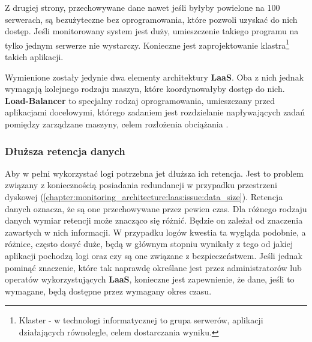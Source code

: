     Z drugiej strony, przechowywane dane nawet jeśli byłyby powielone na 100 serwerach, są bezużyteczne bez oprogramowania, które
    pozwoli uzyskać do nich dostęp. Jeśli monitorowany system jest duży, umieszczenie takiego programu na tylko jednym serwerze nie wystarczy.
    Konieczne jest zaprojektowanie klastra\footnote{Klaster - w technologi informatycznej to grupa serwerów, aplikacji działających równolegle, celem dostarczania wyniku.} takich aplikacji. 
    
    Wymienione zostały jedynie dwa elementy architektury \textbf{LaaS}. Oba z nich jednak wymagają kolejnego rodzaju maszyn, które koordynowałyby dostęp do nich.
    \textbf{Load-Balancer} to specjalny rodzaj oprogramowania, umieszczany przed aplikacjami docelowymi, którego zadaniem jest 
    rozdzielanie napływających zadań pomiędzy zarządzane maszyny, celem rozłożenia obciążania \cite{log_management_to_build_or_to_buy}.
    
    \subsubsection{Dłuższa retencja danych}
    Aby w pełni wykorzystać logi potrzebna jet dłuższa ich retencja. Jest to problem związany z koniecznością posiadania
    redundancji w przypadku przestrzeni dyskowej (\ref{chapter:monitoring_architecture:laas:issue:data_size}). 
    Retencja danych oznacza, że są one przechowywane przez pewien czas. Dla różnego rodzaju danych wymiar retencji
    może znacząco się różnić. Będzie on zależał od znaczenia zawartych w nich informacji. W przypadku logów
    kwestia ta wygląda podobnie, a różnice, często dosyć duże, będą w głównym stopniu wynikały z tego od jakiej
    aplikacji pochodzą logi oraz czy są one związane z bezpieczeństwem. Jeśli jednak pominąć znaczenie, które 
    tak naprawdę określane jest przez administratorów lub operatów wykorzystujących \textbf{LaaS}, konieczne jest
    zapewnienie, że dane, jeśli to wymagane, będą dostępne przez wymagany okres czasu. 